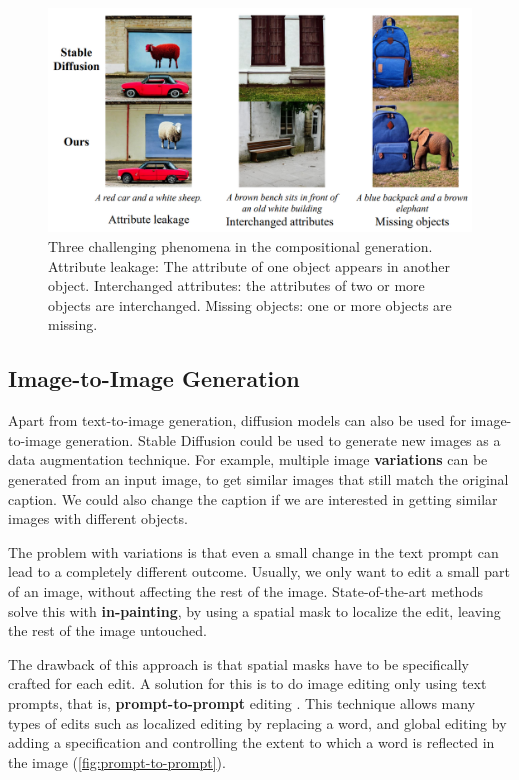 \begin{figure}[ht]
    \centering
    \includegraphics[width=\linewidth]{images/future/training-free.png}
    \caption{Three challenging phenomena in the compositional generation. Attribute leakage: The attribute of one object appears in another object. Interchanged attributes: the attributes of two or more objects are interchanged. Missing objects: one or more objects are missing.}
    \label{fig:training-free}
\end{figure}

\subsection{Image-to-Image Generation}

Apart from text-to-image generation, diffusion models can also be used for image-to-image generation. Stable Diffusion \cite{rombach2021highresolution} could be used to generate new images as a data augmentation technique. For example, multiple image \textbf{variations} can be generated from an input image, to get similar images that still match the original caption. We could also change the caption if we are interested in getting similar images with different objects. 

The problem with variations is that even a small change in the text prompt can lead to a completely different outcome. Usually, we only want to edit a small part of an image, without affecting the rest of the image. State-of-the-art methods solve this with \textbf{in-painting}, by using a spatial mask to localize the edit, leaving the rest of the image untouched.

The drawback of this approach is that spatial masks have to be specifically crafted for each edit. A solution for this is to do image editing only using text prompts, that is, \textbf{prompt-to-prompt} editing \cite{hertz2022prompt}. This technique allows many types of edits such as localized editing by replacing a word, and global editing by adding a specification and controlling the extent to which a word is reflected in the image (\cref{fig:prompt-to-prompt}).


